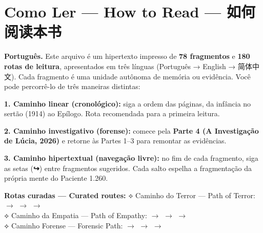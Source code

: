 \cleardoublepage
\thispagestyle{empty}
\chapter*{Como Ler --- How to Read --- 如何阅读本书}

\begingroup

\noindent\textbf{Português.} Este arquivo é um hipertexto impresso de \textbf{78 fragmentos} e \textbf{180 rotas de leitura}, apresentados em três línguas (Português → English → 简体中文). Cada fragmento é uma unidade autônoma de memória ou evidência. Você pode percorrê-lo de três maneiras distintas:

\vspace{0.6em}

\noindent\textbf{1. Caminho linear (cronológico):} siga a ordem das páginas, da infância no sertão (1914) ao Epílogo. Rota recomendada para a primeira leitura.

\vspace{0.4em}
\noindent\textbf{2. Caminho investigativo (forense):} comece pela \textbf{Parte 4 (A Investigação de Lúcia, 2026)} e retorne às Partes 1--3 para remontar as evidências.

\vspace{0.4em}
\noindent\textbf{3. Caminho hipertextual (navegação livre):} no fim de cada fragmento, siga as setas (\textbf{↪}) entre fragmentos sugeridos. Cada salto espelha a fragmentação da própria mente do Paciente 1.260.

\vspace{0.6em}

\noindent\textbf{Rotas curadas --- Curated routes:}
\let\trilangref\trilangrefpt
\noindent\textcolor{sangue}{⟡ Caminho do Terror --- Path of Terror:}  $\rightarrow$  $\rightarrow$  $\rightarrow$ \\[0.2em]
\noindent\textcolor{sangue}{⟡ Caminho da Empatia --- Path of Empathy:}  $\rightarrow$  $\rightarrow$  $\rightarrow$ \\[0.2em]
\noindent\textcolor{sangue}{⟡ Caminho Forense --- Forensic Path:}  $\rightarrow$  $\rightarrow$  $\rightarrow$ 

